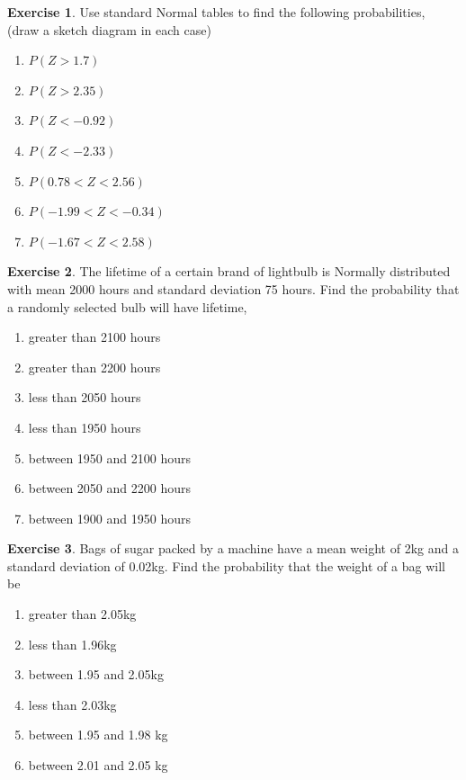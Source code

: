 \documentclass[
]{book}
\theoremstyle{definition}
\theoremstyle{definition}
\theoremstyle{definition}
\newtheorem{exercise}{Exercise}[chapter]
\theoremstyle{definition}
\theoremstyle{remark}
\begin{document}
\begin{exercise}

Use standard Normal tables to find the following
probabilities, (draw a sketch diagram in each case)

\begin{enumerate}
\def\labelenumi{\roman{enumi}.}
\item
  \(P(Z>1.7)\)
\item
  \(P(Z>2.35)\)
\item
  \(P(Z<-0.92)\)
\item
  \(P(Z<-2.33)\)
\item
  \(P(0.78<Z<2.56)\)
\item
  \(P(-1.99<Z<-0.34)\)
\item
  \(P(-1.67<Z<2.58)\)
\end{enumerate}

\end{exercise}

\begin{exercise}

The lifetime of a certain brand of lightbulb is Normally distributed with
mean 2000 hours and standard deviation 75 hours. Find the probability that a
randomly selected bulb will have lifetime,

\begin{enumerate}
\def\labelenumi{\alph{enumi}.}
\item
  greater than 2100 hours
\item
  greater than 2200 hours
\item
  less than 2050 hours
\item
  less than 1950 hours
\item
  between 1950 and 2100 hours
\item
  between 2050 and 2200 hours
\item
  between 1900 and 1950 hours
\end{enumerate}

\end{exercise}

\begin{exercise}

Bags of sugar packed by a machine have a mean weight of 2kg and a
standard deviation of 0.02kg. Find the probability that the weight of a
bag will be

\begin{enumerate}
\def\labelenumi{\roman{enumi}.}
\item
  greater than 2.05kg
\item
  less than 1.96kg
\item
  between 1.95 and 2.05kg
\item
  less than 2.03kg
\item
  between 1.95 and 1.98 kg
\item
  between 2.01 and 2.05 kg
\end{enumerate}

\end{exercise}
\end{document}
